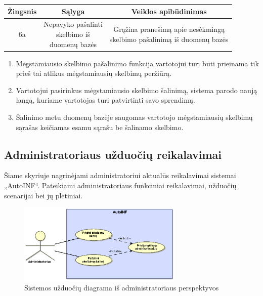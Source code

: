 \documentclass[12pt]{article}
\begin{document}
		\begin{center}
		\begin{tabular}{ | c | c | c | }
			\hline
			Žingsnis & Sąlyga & Veiklos apibūdinimas \\ \hline
			6a       & \makecell{Nepavyko pašalinti \\ skelbimo iš \\ duomenų bazės} & \makecell{Grąžina pranešimą apie nesėkmingą \\ skelbimo pašalinimą iš duomenų bazės} \\ \hline
		\end{tabular}
		\end{center}
		\bigskip
		
	\begin{enumerate}[resume,labelindent=10pt,leftmargin=2.2cm]
		\item Mėgstamiausio skelbimo pašalinimo funkcija vartotojui turi būti prieinama tik prieš tai atlikus mėgstamiausių skelbimų peržiūrą.
		\item Vartotojui pasirinkus mėgstamiausio skelbimo šalinimą, sistema parodo naują langą, kuriame vartotojas turi patvirtinti savo sprendimą.
		\item Šalinimo metu duomenų bazėje saugomas vartotojo mėgstamiausių skelbimų sąrašas keičiamas esamu sąrašu be šalinamo skelbimo.
	\end{enumerate}		
	\pagebreak	
	
	\subsection{Administratoriaus užduočių reikalavimai}
	Šiame skyriuje nagrinėjami administratoriui aktualūs reikalavimai sistemai „AutoINF“. Pateikiami administratoriaus funkciniai reikalavimai, užduočių scenarijai bei jų plėtiniai.
	
	\begin{figure}[h]
		\begin{center}
			\includegraphics[width=0.7\textwidth]{TikslaiAdministratorius.eps}
			\caption{Sistemos užduočių diagrama iš administratoriaus perspektyvos\label{UseCaseAdmin2}}
		\end{center}
	\end{figure}
	\pagebreak
	
\end{document}
